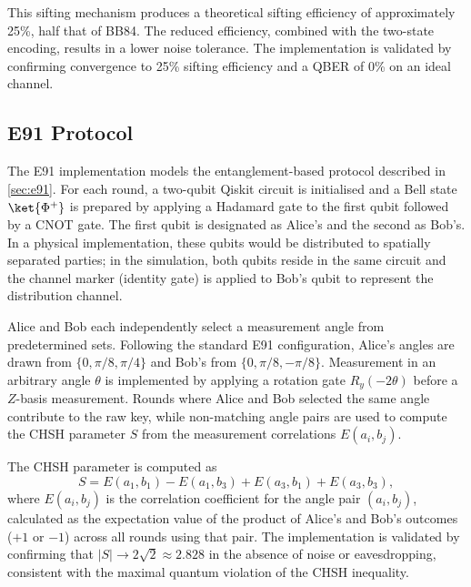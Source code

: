 This sifting mechanism produces a theoretical sifting efficiency of approximately 25\%, half that of BB84. The reduced efficiency, combined with the two-state encoding, results in a lower noise tolerance. The implementation is validated by confirming convergence to 25\% sifting efficiency and a QBER of 0\% on an ideal channel.

% 


\subsection{E91 Protocol}

The E91 implementation models the entanglement-based protocol described in \cref{sec:e91}. For each round, a two-qubit Qiskit circuit is initialised and a Bell state $\ket{\Phi^+}$ is prepared by applying a Hadamard gate to the first qubit followed by a CNOT gate. The first qubit is designated as Alice's and the second as Bob's. In a physical implementation, these qubits would be distributed to spatially separated parties; in the simulation, both qubits reside in the same circuit and the channel marker (identity gate) is applied to Bob's qubit to represent the distribution channel.

Alice and Bob each independently select a measurement angle from predetermined sets. Following the standard E91 configuration, Alice's angles are drawn from $\{0, \pi/8, \pi/4\}$ and Bob's from $\{0, \pi/8, -\pi/8\}$. Measurement in an arbitrary angle $\theta$ is implemented by applying a rotation gate $R_y(-2\theta)$ before a $Z$-basis measurement. Rounds where Alice and Bob selected the same angle contribute to the raw key, while non-matching angle pairs are used to compute the CHSH parameter $S$ from the measurement correlations $E(a_i, b_j)$.

The CHSH parameter is computed as
%
\begin{equation}
\label{eq:chsh-computation}
S = E(a_1, b_1) - E(a_1, b_3) + E(a_3, b_1) + E(a_3, b_3),
\end{equation}
%
where $E(a_i, b_j)$ is the correlation coefficient for the angle pair $(a_i, b_j)$, calculated as the expectation value of the product of Alice's and Bob's outcomes ($+1$ or $-1$) across all rounds using that pair. The implementation is validated by confirming that $|S| \rightarrow 2\sqrt{2} \approx 2.828$ in the absence of noise or eavesdropping, consistent with the maximal quantum violation of the CHSH inequality.

